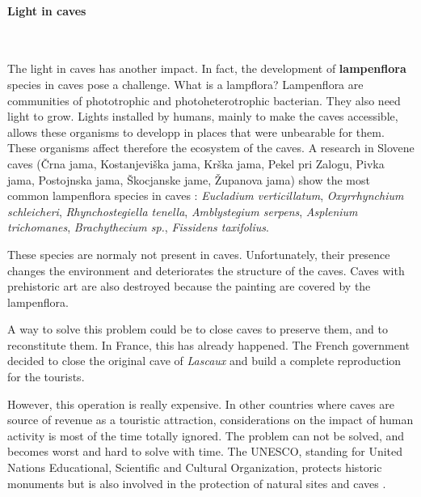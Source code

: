 \documentclass[draft, final]{report}
\begin{document}
\paragraph{Light in caves}
~~\\
\par
\indent The light in caves has another impact. In fact, the development of \textbf{lampenflora} species in caves pose a challenge. What is a lampflora? Lampenflora are communities of phototrophic and photoheterotrophic bacterian. They also need light to grow. Lights installed by humans, mainly to make the caves accessible, allows these organisms to developp in places that were unbearable for them. These organisms affect therefore the ecosystem of the caves. A research in Slovene caves (Črna jama, Kostanjeviška jama, Krška jama, Pekel pri Zalogu, Pivka jama, Postojnska jama, Škocjanske jame, Županova jama) show the most common lampenflora species in  caves : \emph{Eucladium verticillatum}, \emph{Oxyrrhynchium schleicheri}, \emph{Rhynchostegiella tenella}, \emph{Amblystegium serpens}, \emph{Asplenium trichomanes}, \emph{Brachythecium sp.}, \emph{Fissidens taxifolius}. \\
\par
\indent These species are normaly not present in caves. Unfortunately, their presence changes the environment and deteriorates the structure of the caves. Caves with prehistoric art are also destroyed because the painting are covered by the lampenflora.\\
\par
\indent A way to solve this problem could be to close caves to preserve them, and to reconstitute them. In France, this has already happened. The French government
decided to close the original cave of \emph{Lascaux} and build a complete reproduction for the tourists. \\
\par
\indent However, this operation is really expensive.  In other countries where caves are source of revenue as a touristic attraction, considerations on the impact of human activity is most of the time totally ignored. The problem can not be solved, and becomes worst and hard to solve with time. The UNESCO, standing for United Nations Educational, Scientific and Cultural Organization, protects historic monuments but is also involved in the protection of natural sites and caves
.
\newline
\newline
\newline
\newline
\end{document}
